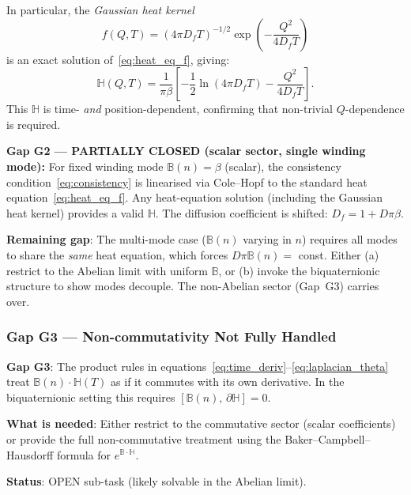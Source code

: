\documentclass[12pt]{article}
\theoremstyle{definition}
\theoremstyle{remark}
\begin{document}
In particular, the \emph{Gaussian heat kernel}
\begin{equation}
  f(Q, T) = (4\pi D_f T)^{-1/2}
    \exp\!\left(-\frac{Q^2}{4D_f T}\right)
  \label{eq:gaussian_f}
\end{equation}
is an exact solution of~\eqref{eq:heat_eq_f}, giving:
\begin{equation}
  \mathbb{H}(Q, T) = \frac{1}{\pi\beta}\left[
    -\frac{1}{2}\ln(4\pi D_f T) - \frac{Q^2}{4D_f T}\right].
  \label{eq:H_gaussian}
\end{equation}
This $\mathbb{H}$ is time- \emph{and} position-dependent, confirming that
non-trivial $Q$-dependence is required.

\begin{resultbox}
\textbf{Gap G2 — PARTIALLY CLOSED (scalar sector, single winding mode):}
For fixed winding mode $\mathbb{B}(n) = \beta$ (scalar), the consistency
condition~\eqref{eq:consistency} is linearised via Cole--Hopf to the standard
heat equation~\eqref{eq:heat_eq_f}.  Any heat-equation solution (including the
Gaussian heat kernel) provides a valid $\mathbb{H}$.  The diffusion coefficient
is shifted: $D_f = 1 + D\pi\beta$.

\medskip
\textbf{Remaining gap}: The multi-mode case ($\mathbb{B}(n)$ varying in $n$)
requires all modes to share the \emph{same} heat equation, which forces
$D\pi\mathbb{B}(n) = $ const.  Either (a) restrict to the Abelian limit with
uniform $\mathbb{B}$, or (b) invoke the biquaternionic structure to show modes
decouple.  The non-Abelian sector (Gap~G3) carries over.
\end{resultbox}

\subsubsection{Gap G3 — Non-commutativity Not Fully Handled}

\begin{gapbox}
\textbf{Gap G3}: The product rules in equations~\eqref{eq:time_deriv}--\eqref{eq:laplacian_theta}
treat $\mathbb{B}(n)\cdot\mathbb{H}(T)$ as if it commutes with its own derivative.
In the biquaternionic setting this requires $[\mathbb{B}(n),\,\partial\mathbb{H}] = 0$.

\textbf{What is needed}: Either restrict to the commutative sector (scalar coefficients)
or provide the full non-commutative treatment using the Baker--Campbell--Hausdorff
formula for $e^{\mathbb{B}\cdot\mathbb{H}}$.

\textbf{Status}: OPEN sub-task (likely solvable in the Abelian limit).
\end{gapbox}
\end{document}
